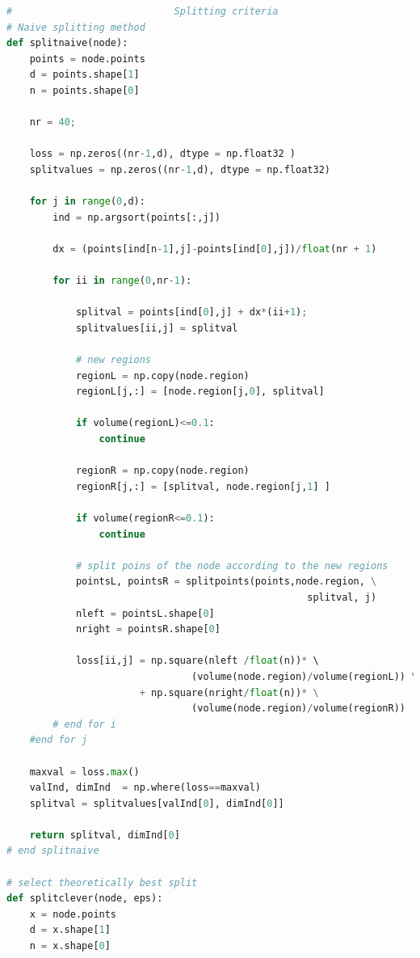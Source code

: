 \documentclass{article}
\begin{document}
\begin{lstlisting}[language=Python]
#                            Splitting criteria
# Naive splitting method
def splitnaive(node):
    points = node.points
    d = points.shape[1]
    n = points.shape[0]
    
    nr = 40;
   
    loss = np.zeros((nr-1,d), dtype = np.float32 )
    splitvalues = np.zeros((nr-1,d), dtype = np.float32)

    for j in range(0,d):
        ind = np.argsort(points[:,j])

        dx = (points[ind[n-1],j]-points[ind[0],j])/float(nr + 1)

        for ii in range(0,nr-1):           

            splitval = points[ind[0],j] + dx*(ii+1);
            splitvalues[ii,j] = splitval
            
            # new regions
            regionL = np.copy(node.region)
            regionL[j,:] = [node.region[j,0], splitval]

            if volume(regionL)<=0.1:
                continue
                
            regionR = np.copy(node.region)       
            regionR[j,:] = [splitval, node.region[j,1] ]           

            if volume(regionR<=0.1):
                continue
                
            # split poins of the node according to the new regions
            pointsL, pointsR = splitpoints(points,node.region, \
                                                    splitval, j)
            nleft = pointsL.shape[0]
            nright = pointsR.shape[0]
                                
            loss[ii,j] = np.square(nleft /float(n))* \ 
            					(volume(node.region)/volume(regionL)) \
                       + np.square(nright/float(n))* \
                         		(volume(node.region)/volume(regionR))
        # end for i    
    #end for j
                   
    maxval = loss.max()
    valInd, dimInd  = np.where(loss==maxval)       
    splitval = splitvalues[valInd[0], dimInd[0]]    
       
    return splitval, dimInd[0]    
# end splitnaive

# select theoretically best split
def splitclever(node, eps):
    x = node.points
    d = x.shape[1]
    n = x.shape[0]
    

\end{lstlisting}
\end{document}
